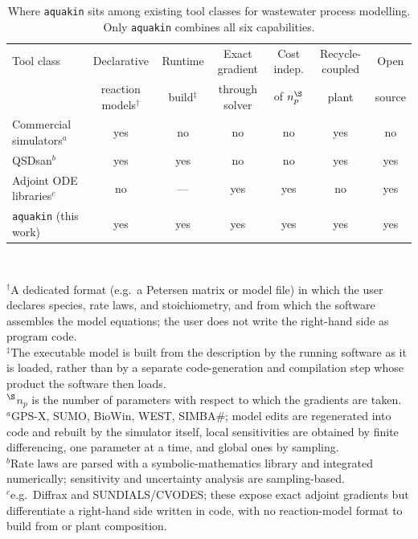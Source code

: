 \documentclass{article}
\begin{document}
\begin{table}[htbp]
\centering
\caption{Where \texttt{aquakin} sits among existing tool classes for wastewater process modelling. Only \texttt{aquakin} combines all six capabilities.}
\label{tab:landscape}
\small
\setlength{\tabcolsep}{5pt}
\begin{tabular}{lcccccc}
\toprule
Tool class & Declarative & Runtime & Exact gradient & Cost indep. & Recycle-coupled & Open \\
 & reaction models$^{\dagger}$ & build$^{\ddagger}$ & through solver & of $n_p^{\S}$ & plant & source \\
\midrule
Commercial simulators$^{a}$                  & yes & no  & no  & no  & yes & no  \\
QSDsan$^{b}$                                  & yes & yes & no  & no  & yes & yes \\
Adjoint ODE libraries$^{c}$                  & no  & --- & yes & yes & no  & yes \\
\texttt{aquakin} (this work)                  & yes & yes & yes & yes & yes & yes \\
\bottomrule
\end{tabular}
\\[3pt]
{\footnotesize\raggedright
$^{\dagger}$A dedicated format (e.g.\ a Petersen matrix or model file) in which the user declares species, rate laws, and stoichiometry, and from which the software assembles the model equations; the user does not write the right-hand side as program code.\\
$^{\ddagger}$The executable model is built from the description by the running software as it is loaded, rather than by a separate code-generation and compilation step whose product the software then loads.\\
$^{\S}$$n_p$ is the number of parameters with respect to which the gradients are taken.\\
$^{a}$GPS-X, SUMO, BioWin, WEST, SIMBA\#; model edits are regenerated into code and rebuilt by the simulator itself, local sensitivities are obtained by finite differencing, one parameter at a time, and global ones by sampling.\\
$^{b}$Rate laws are parsed with a symbolic-mathematics library and integrated numerically; sensitivity and uncertainty analysis are sampling-based.\\
$^{c}$e.g.\ Diffrax and SUNDIALS/CVODES; these expose exact adjoint gradients but differentiate a right-hand side written in code, with no reaction-model format to build from or plant composition.\par}
\end{table}
\end{document}
